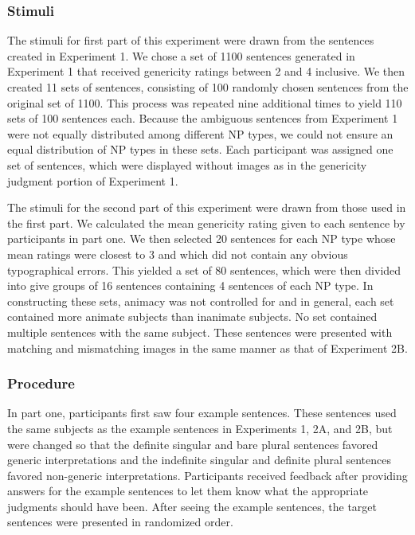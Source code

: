 \documentclass[10pt,letterpaper]{article}
\begin{document}
\subsubsection{Stimuli} \quad The stimuli for first part of this experiment were drawn from the sentences created in Experiment 1. We chose a set of 1100 sentences generated in Experiment 1 that received genericity ratings between 2 and 4 inclusive. We then created 11 sets of sentences, consisting of 100 randomly chosen sentences from the original set of 1100. This process was repeated nine additional times to yield 110 sets of 100 sentences each. Because the ambiguous sentences from Experiment 1 were not equally distributed among different NP types, we could not ensure an equal distribution of NP types in these sets. Each participant was assigned one set of sentences, which were displayed without images as in the genericity judgment portion of Experiment 1.

The stimuli for the second part of this experiment were drawn from those used in the first part. We calculated the mean genericity rating given to each sentence by participants in part one. We then selected 20 sentences for each NP type whose mean ratings were closest to 3 and which did not contain any obvious typographical errors. This yielded a set of 80 sentences, which were then divided into give groups of 16 sentences containing 4 sentences of each NP type. In constructing these sets, animacy was not controlled for and in general, each set contained more animate subjects than inanimate subjects. No set contained multiple sentences with the same subject. These sentences were presented with matching and mismatching images in the same manner as that of Experiment 2B. 

\subsubsection{Procedure} \quad In part one, participants first saw four example sentences. These sentences used the same subjects as the example sentences in Experiments 1, 2A, and 2B, but were changed so that the definite singular and bare plural sentences favored generic interpretations and the indefinite singular and definite plural sentences favored non-generic interpretations. Participants received feedback after providing answers for the example sentences to let them know what the appropriate judgments should have been. After seeing the example sentences, the target sentences were presented in randomized order.
\end{document}
